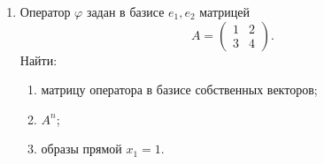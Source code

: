 \begin{enumerate}
    \item Оператор $\varphi$ задан в базисе $e_1,e_2$ матрицей
    \[
    A=\begin{pmatrix}
    1 & 2 \\
    3 & 4
    \end{pmatrix}.
    \]
    Найти:
    \begin{enumerate}
    \item матрицу оператора в базисе собственных векторов;
    \item $A^n$;
    \item образы прямой $x_1 = 1$.
    \end{enumerate}
\end{enumerate}
